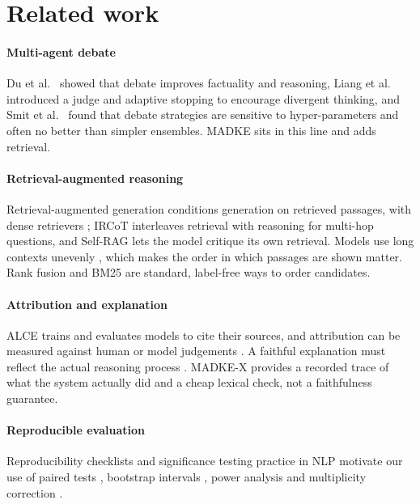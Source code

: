 \section{Related work}
\label{sec:related_work}

\paragraph{Multi-agent debate} Du et al.~\cite{du2024debate} showed that debate improves factuality and reasoning, Liang et al.~\cite{liang2024divergent} introduced a judge and adaptive stopping to encourage divergent thinking, and Smit et al.~\cite{smit2024mad} found that debate strategies are sensitive to hyper-parameters and often no better than simpler ensembles. MADKE sits in this line and adds retrieval.

\paragraph{Retrieval-augmented reasoning} Retrieval-augmented generation \cite{lewis2020rag} conditions generation on retrieved passages, with dense retrievers \cite{karpukhin2020dpr}; IRCoT \cite{trivedi2023ircot} interleaves retrieval with reasoning for multi-hop questions, and Self-RAG \cite{asai2024selfrag} lets the model critique its own retrieval. Models use long contexts unevenly \cite{liu2024lost}, which makes the order in which passages are shown matter. Rank fusion \cite{cormack2009rrf} and BM25 \cite{robertson2009bm25} are standard, label-free ways to order candidates.

\paragraph{Attribution and explanation} ALCE \cite{gao2023alce} trains and evaluates models to cite their sources, and attribution can be measured against human or model judgements \cite{rashkin2023attribution}. A faithful explanation must reflect the actual reasoning process \cite{jacovi2020faithful}. MADKE-X provides a recorded trace of what the system actually did and a cheap lexical check, not a faithfulness guarantee.

\paragraph{Reproducible evaluation} Reproducibility checklists \cite{pineau2021reproducibility} and significance testing practice in NLP \cite{dror2018hitchhiker} motivate our use of paired tests \cite{mcnemar1947}, bootstrap intervals \cite{efron1979bootstrap}, power analysis \cite{cohen1988power} and multiplicity correction \cite{holm1979}.
